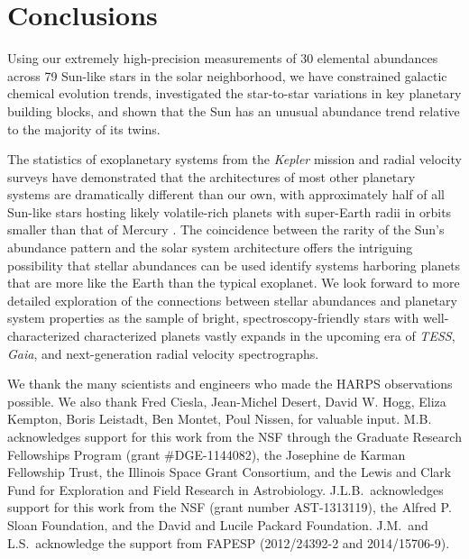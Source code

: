 \documentclass[twocolumn, trackchanges]{aastex62}
\newcommand{\acronym}[1]{{\small{#1}}}
\begin{document}
\section{Conclusions}

Using our extremely high-precision measurements of 30 elemental abundances across 79 Sun-like stars in the solar neighborhood, we have constrained galactic chemical evolution trends, investigated the star-to-star variations in key planetary building blocks, and shown that the Sun has an unusual abundance trend relative to the majority of its twins.

The statistics of exoplanetary systems from the \textit{Kepler} mission and radial velocity surveys have demonstrated that the architectures of most other planetary systems are dramatically different than our own, with approximately half of all Sun-like stars hosting likely volatile-rich planets with super-Earth radii in orbits smaller than that of Mercury \citep{winn15, rogers15}. 
The coincidence between the rarity of the Sun's abundance pattern and the solar system architecture offers the intriguing possibility that stellar abundances can be used identify systems harboring planets that are more like the Earth than the typical exoplanet. 
We look forward to more detailed exploration of the connections between stellar abundances and planetary system properties as the sample of bright, spectroscopy-friendly stars with well-characterized characterized planets vastly expands in the upcoming era of \textit{\acronym{TESS}}, \textit{Gaia}, and next-generation radial velocity spectrographs.


\acknowledgements
We thank the many scientists and engineers who made the \acronym{HARPS} observations possible. We also thank Fred Ciesla, Jean-Michel Desert,  David W. Hogg, Eliza Kempton, Boris Leistadt, Ben Montet,  Poul Nissen,  for valuable input.  M.B. acknowledges support for this work from the \acronym{NSF} through the Graduate Research Fellowships Program (grant \#DGE-1144082), the Josephine de Karman Fellowship Trust, the Illinois Space Grant Consortium, and the Lewis and Clark Fund for Exploration and Field Research in Astrobiology. J.L.B.\ acknowledges support for this work from the NSF (grant number AST-1313119), the Alfred P. Sloan Foundation, and the David and Lucile Packard Foundation. J.M.\ and L.S.\ acknowledge the support from \acronym{FAPESP} (2012/24392-2 and 2014/15706-9).
\end{document}
